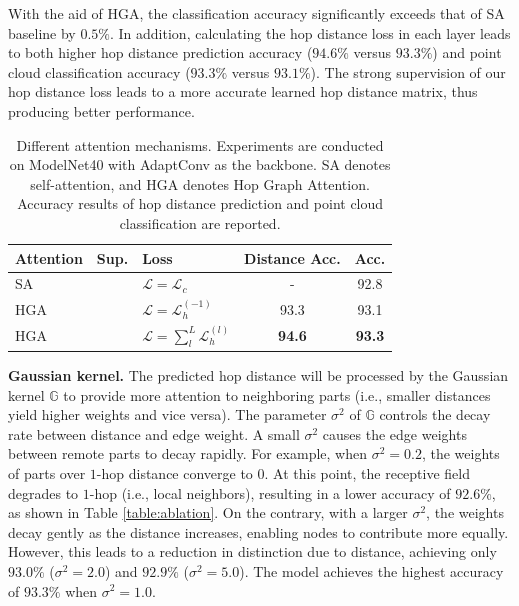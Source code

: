 \documentclass[letterpaper]{article} %
\newcommand{\cmark}{\ding{51}}
\newcommand{\xmark}{\ding{55}}
\begin{document}
With the aid of HGA, the classification accuracy significantly exceeds that of SA baseline by $0.5\%$.
In addition, calculating the hop distance loss in each layer leads to both higher hop distance prediction accuracy (\(94.6\% \) versus \(93.3\%\)) and point cloud classification accuracy ($93.3\%$ versus $93.1\%$).
The strong supervision of our hop distance loss leads to a more accurate learned hop distance matrix, thus producing better performance.

\setlength{\tabcolsep}{4pt}
\begin{table}
\begin{center}
\begin{tabular}{l c l c c}
\hline
Attention & Sup. & Loss & Distance Acc. & Acc.\\
\hline
SA & \cmark & $\mathcal{L} = \mathcal{L}_c $ & - & 92.8\\
HGA & \xmark & $\mathcal{L} = \mathcal{L}_h^{(-1)}$ & 93.3 & 93.1\\
HGA & \xmark & $\mathcal{L} = \sum_{l}^{L}\mathcal{L}_h^{(l)}$ & \bf{94.6} & \bf{93.3}\\
\hline
\end{tabular}
\end{center}
\caption{
Different attention mechanisms. Experiments are conducted on ModelNet40 with AdaptConv as the backbone.
SA denotes self-attention, and HGA denotes Hop Graph Attention.
Accuracy results of hop distance prediction and point cloud classification are reported.
}
\label{table:attention}
\end{table}


\textbf{Gaussian kernel.}
The predicted hop distance will be processed by the Gaussian kernel \(\mathbb{G}\) to provide more attention to neighboring parts (i.e., smaller distances yield higher weights and vice versa).
The parameter \(\sigma^2\) of \(\mathbb{G}\) controls the decay rate between distance and edge weight.
A small \(\sigma^2\) causes the edge weights between remote parts to decay rapidly.
For example, when \(\sigma^2=0.2\), the weights of parts over \(1\)-hop distance converge to $0$. At this point, the receptive field degrades to $1$-hop (i.e., local neighbors), resulting in a lower accuracy of $92.6\%$, as shown in Table \ref{table:ablation}.
On the contrary, with a larger $\sigma^2$, the weights decay gently as the distance increases, enabling nodes to contribute more equally.
However, this leads to a reduction in distinction due to distance, achieving only $93.0\%$ ($\sigma^2=2.0$) and $92.9\%$ ($\sigma^2=5.0$).
The model achieves the highest accuracy of $93.3\%$ when $\sigma^2=1.0$.
\end{document}
